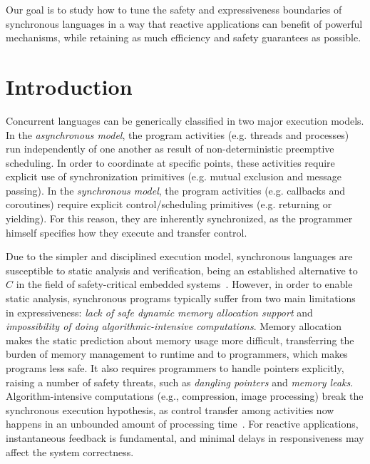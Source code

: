 \documentclass[pdftex,12pt,a4paper]{article}
\begin{document}
Our goal is to study how to tune the safety and expressiveness boundaries of
synchronous languages in a way that reactive applications can benefit of 
powerful mechanisms, while retaining as much efficiency and safety guarantees 
as possible.

\section{Introduction}

Concurrent languages can be generically classified in two major execution 
models.
%
In the \emph{asynchronous model}, the program activities (e.g. threads and 
processes) run independently of one another as result of non-deterministic 
preemptive scheduling.
In order to coordinate at specific points, these activities require explicit 
use of synchronization primitives (e.g. mutual exclusion and message passing).
%
In the \emph{synchronous model}, the program activities (e.g. callbacks and 
coroutines) require explicit control/scheduling primitives (e.g. returning or 
yielding).
For this reason, they are inherently synchronized, as the programmer himself 
specifies how they execute and transfer control.

Due to the simpler and disciplined execution model, synchronous languages are 
susceptible to static analysis and verification, being an established 
alternative to $C$ in the field of safety-critical embedded 
systems~\cite{rp.twelve}.
%
However, in order to enable static analysis, synchronous programs typically 
suffer from two main limitations in expressiveness:
\emph{lack of safe dynamic memory allocation support} and
\emph{impossibility of doing algorithmic-intensive computations}.
%
Memory allocation makes the static prediction about memory usage more 
difficult, transferring the burden of memory management to runtime and to 
programmers, which makes programs less safe.
It also requires programmers to handle pointers explicitly, raising a number of 
safety threats, such as \emph{dangling pointers} and \emph{memory leaks}.
%
%
Algorithm-intensive computations (e.g., compression, image processing) break 
the synchronous execution hypothesis, as control transfer among activities now 
happens in an unbounded amount of processing time~\cite{rp.hypothesis}.
%
For reactive applications, instantaneous feedback is fundamental, and minimal 
delays in responsiveness may affect the system correctness.
\end{document}
